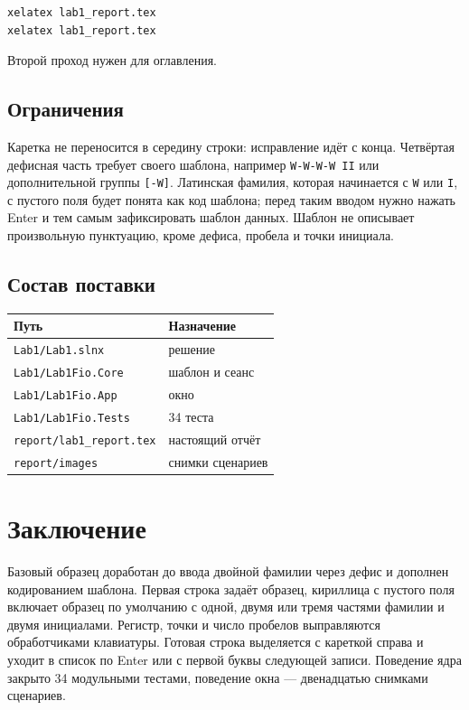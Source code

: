 \documentclass[a4paper,14pt]{extarticle}
\begin{document}
\begin{Verbatim}
xelatex lab1_report.tex
xelatex lab1_report.tex
\end{Verbatim}

Второй проход нужен для оглавления.

\subsection{Ограничения}

Каретка не переносится в середину строки: исправление идёт с конца. Четвёртая дефисная часть требует своего шаблона, например \texttt{W-W-W-W II} или дополнительной группы \texttt{[-W]}. Латинская фамилия, которая начинается с \texttt{W} или \texttt{I}, с пустого поля будет понята как код шаблона; перед таким вводом нужно нажать Enter и тем самым зафиксировать шаблон данных. Шаблон не описывает произвольную пунктуацию, кроме дефиса, пробела и точки инициала.

\subsection{Состав поставки}

\begin{center}
\begin{tabular}{p{}p{}}
\toprule
Путь & Назначение\\
\midrule
\texttt{Lab1/Lab1.slnx} & решение\\
\texttt{Lab1/Lab1Fio.Core} & шаблон и сеанс\\
\texttt{Lab1/Lab1Fio.App} & окно\\
\texttt{Lab1/Lab1Fio.Tests} & 34 теста\\
\texttt{report/lab1\_report.tex} & настоящий отчёт\\
\texttt{report/images} & снимки сценариев\\
\bottomrule
\end{tabular}
\end{center}

\section*{Заключение}

Базовый образец доработан до ввода двойной фамилии через дефис и дополнен кодированием шаблона. Первая строка задаёт образец, кириллица с пустого поля включает образец по умолчанию с одной, двумя или тремя частями фамилии и двумя инициалами. Регистр, точки и число пробелов выправляются обработчиками клавиатуры. Готовая строка выделяется с кареткой справа и уходит в список по Enter или с первой буквы следующей записи. Поведение ядра закрыто 34 модульными тестами, поведение окна --- двенадцатью снимками сценариев.
\end{document}
